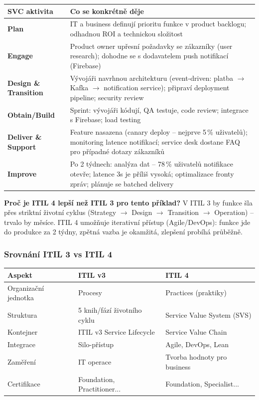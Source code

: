 \begin{center}
\begin{tabular}{p{3cm}p{9cm}}
\toprule
\textbf{SVC aktivita} & \textbf{Co se konkrétně děje} \\
\midrule
\textbf{Plan} &
  IT a business definují prioritu funkce v product backlogu; odhadnou ROI a technickou složitost \\
\textbf{Engage} &
  Product owner upřesní požadavky se zákazníky (user research); dohodne se s dodavatelem push notifikací (Firebase) \\
\textbf{Design \& Transition} &
  Vývojáři navrhnou architekturu (event-driven: platba $\to$ Kafka $\to$ notification service);
  připraví deployment pipeline; security review \\
\textbf{Obtain/Build} &
  Sprint: vývojáři kódují, QA testuje, code review; integrace s Firebase; load testing \\
\textbf{Deliver \& Support} &
  Feature nasazena (canary deploy -- nejprve 5\,\% uživatelů); monitoring latence notifikací;
  service desk dostane FAQ pro případné dotazy zákazníků \\
\textbf{Improve} &
  Po 2 týdnech: analýza dat -- 78\,\% uživatelů notifikace otevře; latence 3s je příliš vysoká;
  optimalizace fronty zpráv; plánuje se batched delivery \\
\bottomrule
\end{tabular}
\end{center}

\textbf{Proč je ITIL 4 lepší než ITIL 3 pro tento příklad?}
V ITIL 3 by funkce šla přes striktní životní cyklus (Strategy $\to$ Design $\to$ Transition $\to$ Operation) --
trvalo by měsíce. ITIL 4 umožňuje iterativní přístup (Agile/DevOps): funkce jde do produkce za 2 týdny,
zpětná vazba je okamžitá, zlepšení probíhá průběžně.

\subsubsection{Srovnání ITIL 3 vs ITIL 4}

\begin{center}
\begin{tabular}{lll}
\toprule
\textbf{Aspekt} & \textbf{ITIL v3} & \textbf{ITIL 4} \\
\midrule
Organizační jednotka & Procesy & Practices (praktiky) \\
Struktura & 5 knih/fází životního cyklu & Service Value System (SVS) \\
Kontejner & ITIL v3 Service Lifecycle & Service Value Chain \\
Integrace & Silo-přístup & Agile, DevOps, Lean \\
Zaměření & IT operace & Tvorba hodnoty pro business \\
Certifikace & Foundation, Practitioner... & Foundation, Specialist... \\
\bottomrule
\end{tabular}
\end{center}

